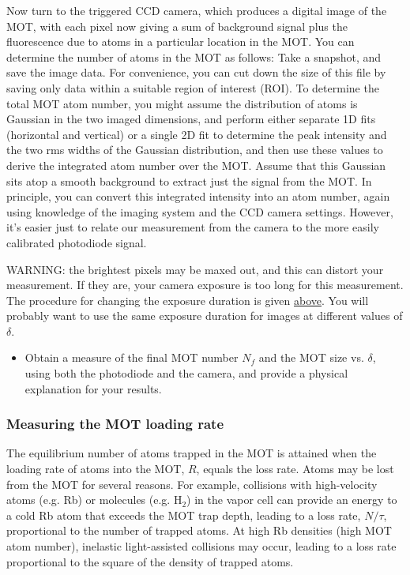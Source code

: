 \documentclass{../lab}
\begin{document}
Now turn to the triggered CCD camera, which produces a digital image of the MOT, with each pixel now giving a sum of background signal plus the fluorescence due to atoms in a particular location in the MOT. You can determine the number of atoms in the MOT as follows: Take a snapshot, and save the image data. For convenience, you can cut down the size of this file by saving only data within a suitable region of interest (ROI). To determine the total MOT atom number, you might assume the distribution of atoms is Gaussian in the two imaged dimensions, and perform either separate 1D fits (horizontal and vertical) or a single 2D fit to determine the peak intensity and the two rms widths of the Gaussian distribution, and then use these values to derive the integrated atom number over the MOT. Assume that this Gaussian sits atop a smooth background to extract just the signal from the MOT. In principle, you can convert this integrated intensity into an atom number, again using knowledge of the imaging system and the CCD camera settings. However, it's easier just to relate our measurement from the camera to the more easily calibrated photodiode signal.

WARNING: the brightest pixels may be maxed out, and this can distort your measurement. If they are, your camera exposure is too long for this measurement. The procedure for changing the exposure duration is given \hyperref[par:InterfaceToTriggeredCCDCamera]{above}. You will probably want to use the same exposure duration for images at different values of $\delta$.

\begin{itemize}
    \item Obtain a measure of the final MOT number $N_f$ and the MOT size vs. $\delta$, using both the photodiode and the camera, and provide a physical explanation for your results.
\end{itemize}

\subsubsection{Measuring the MOT loading rate}

The equilibrium number of atoms trapped in the MOT is attained when the loading rate of atoms into the MOT, $R $, equals the loss rate. Atoms may be lost from the MOT for several reasons. For example, collisions with high-velocity atoms (e.g. Rb) or molecules (e.g. H$_2$) in the vapor cell can provide an energy to a cold Rb atom that exceeds the MOT trap depth, leading to a loss rate, $N / \tau$, proportional to the number of trapped atoms. At high Rb densities (high MOT atom number), inelastic light-assisted collisions may occur, leading to a loss rate proportional to the square of the density of trapped atoms.
\end{document}
